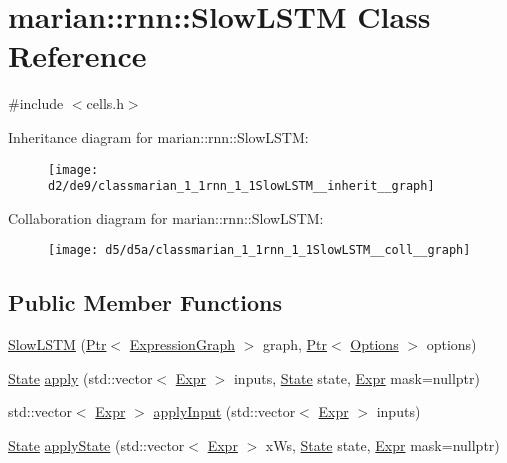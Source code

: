 \hypertarget{classmarian_1_1rnn_1_1SlowLSTM}{}\section{marian\+:\+:rnn\+:\+:Slow\+L\+S\+TM Class Reference}
\label{classmarian_1_1rnn_1_1SlowLSTM}


{\ttfamily \#include $<$cells.\+h$>$}



Inheritance diagram for marian\+:\+:rnn\+:\+:Slow\+L\+S\+TM\+:
\nopagebreak
\begin{figure}[H]
\begin{center}
\leavevmode
\texttt{[image: d2/de9/classmarian\_1\_1rnn\_1\_1SlowLSTM\_\_inherit\_\_graph]}
\end{center}
\end{figure}


Collaboration diagram for marian\+:\+:rnn\+:\+:Slow\+L\+S\+TM\+:
\nopagebreak
\begin{figure}[H]
\begin{center}
\leavevmode
\texttt{[image: d5/d5a/classmarian\_1\_1rnn\_1\_1SlowLSTM\_\_coll\_\_graph]}
\end{center}
\end{figure}
\subsection*{Public Member Functions}
\begin{DoxyCompactItemize}
\item 
\hyperlink{classmarian_1_1rnn_1_1SlowLSTM_a28c3e53540b5187322118062ba5cdc52}{Slow\+L\+S\+TM} (\hyperlink{namespacemarian_ad1a373be43a00ef9ce35666145137b08}{Ptr}$<$ \hyperlink{classmarian_1_1ExpressionGraph}{Expression\+Graph} $>$ graph, \hyperlink{namespacemarian_ad1a373be43a00ef9ce35666145137b08}{Ptr}$<$ \hyperlink{classmarian_1_1Options}{Options} $>$ options)
\item 
\hyperlink{structmarian_1_1rnn_1_1State}{State} \hyperlink{classmarian_1_1rnn_1_1SlowLSTM_a70fd0fdd071fd698f82ede70b1479fbb}{apply} (std\+::vector$<$ \hyperlink{namespacemarian_a498d8baf75b754011078b890b39c8e12}{Expr} $>$ inputs, \hyperlink{structmarian_1_1rnn_1_1State}{State} state, \hyperlink{namespacemarian_a498d8baf75b754011078b890b39c8e12}{Expr} mask=nullptr)
\item 
std\+::vector$<$ \hyperlink{namespacemarian_a498d8baf75b754011078b890b39c8e12}{Expr} $>$ \hyperlink{classmarian_1_1rnn_1_1SlowLSTM_a769b9436d2c615073b0e6f3482dd953b}{apply\+Input} (std\+::vector$<$ \hyperlink{namespacemarian_a498d8baf75b754011078b890b39c8e12}{Expr} $>$ inputs)
\item 
\hyperlink{structmarian_1_1rnn_1_1State}{State} \hyperlink{classmarian_1_1rnn_1_1SlowLSTM_af6563558351e655ddf77f918dfa848a6}{apply\+State} (std\+::vector$<$ \hyperlink{namespacemarian_a498d8baf75b754011078b890b39c8e12}{Expr} $>$ x\+Ws, \hyperlink{structmarian_1_1rnn_1_1State}{State} state, \hyperlink{namespacemarian_a498d8baf75b754011078b890b39c8e12}{Expr} mask=nullptr)
\end{DoxyCompactItemize}
